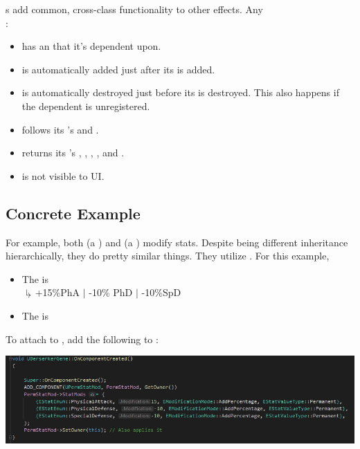 



s add common, cross-class functionality to other effects. Any \\:

\begin{itemize}
	\item{has an  that it's dependent upon.}
	\item{is automatically added just after its  is added.}
	\item{is automatically destroyed just before its  is destroyed. This also happens if the dependent is unregistered.}
	\item{follows its 's  and .}
	\item{returns its 's , , , , and .}
	\item{is not visible to UI.}
\end{itemize}

\subsection{Concrete Example}

For example, both  (a ) and  (a ) modify stats. Despite being different inheritance hierarchically, they do pretty similar things. They utilize . For this example, 
\begin{itemize}
	\item{The  is \\
		\hspace*{2em}$\drsh{}$+15\%PhA $|$ -10\% PhD $|$ -10\%SpD}
	\item{The  is }
\end{itemize}
To attach  to , add the following to :

\begin{center}
	\includegraphics[scale=\ScreenshotScale]{dependent-add}
\end{center}

